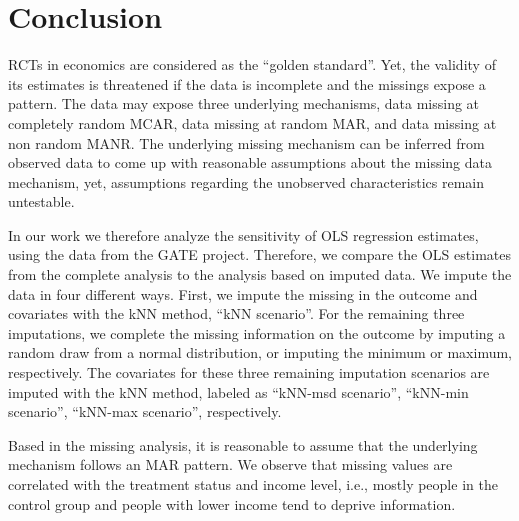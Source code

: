 
\section{Conclusion}
\label{sec:conlcusion}
\acp{RCT} in economics are considered as the ``golden standard''. Yet, the validity of its estimates is threatened if the data is incomplete and the missings expose a pattern. The data may expose three underlying mechanisms, data missing at completely random \ac{MCAR}, data missing at random \ac{MAR}, and data missing at non random \ac{MANR}. The underlying missing mechanism can be inferred from observed data to come up with reasonable assumptions about the missing data mechanism, yet, assumptions regarding the unobserved characteristics remain untestable.

In our work we therefore analyze the sensitivity of \ac{OLS} regression estimates, using the data from the \ac{GATE} project. Therefore, we compare the \ac{OLS} estimates from the complete analysis to the analysis based on imputed data. We impute the data in four different ways. First, we impute the missing in the outcome and covariates with the \ac{kNN} method, ``kNN scenario''. For the remaining three imputations, we complete the missing information on the outcome by imputing a random draw from a normal distribution, or imputing the minimum or maximum, respectively. The covariates for these three remaining imputation scenarios are imputed with the \ac{kNN} method, labeled as ``kNN-msd scenario'', ``kNN-min scenario'', ``kNN-max scenario'', respectively.

Based in the missing analysis, it is reasonable to assume that the underlying mechanism follows an \ac{MAR} pattern. We observe that missing values are correlated with the treatment status and income level, i.e., mostly people in the control group and people with lower income tend to deprive information.

